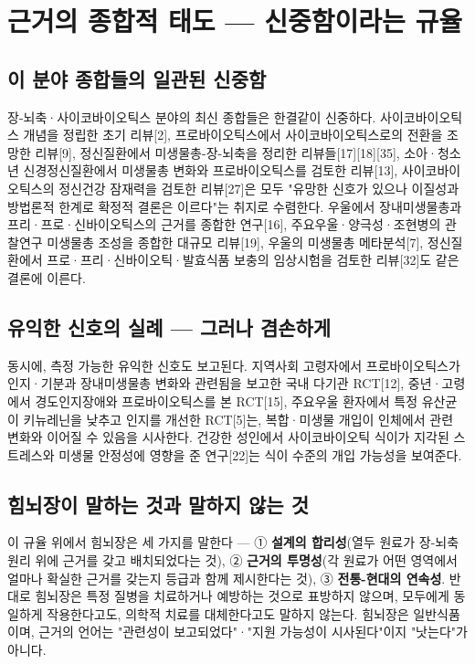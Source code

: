 \documentclass[11pt,oneside]{book}
\begin{document}
\section{근거의 종합적 태도 — 신중함이라는 규율}
\subsection{이 분야 종합들의 일관된 신중함}
장-뇌축·사이코바이오틱스 분야의 최신 종합들은 한결같이 신중하다. 사이코바이오틱스 개념을 정립한 초기 리뷰[2], 프로바이오틱스에서 사이코바이오틱스로의 전환을 조망한 리뷰[9], 정신질환에서 미생물총-장-뇌축을 정리한 리뷰들[17][18][35], 소아·청소년 신경정신질환에서 미생물총 변화와 프로바이오틱스를 검토한 리뷰[13], 사이코바이오틱스의 정신건강 잠재력을 검토한 리뷰[27]은 모두 "유망한 신호가 있으나 이질성과 방법론적 한계로 확정적 결론은 이르다"는 취지로 수렴한다. 우울에서 장내미생물총과 프리·프로·신바이오틱스의 근거를 종합한 연구[16], 주요우울·양극성·조현병의 관찰연구 미생물총 조성을 종합한 대규모 리뷰[19], 우울의 미생물총 메타분석[7], 정신질환에서 프로·프리·신바이오틱·발효식품 보충의 임상시험을 검토한 리뷰[32]도 같은 결론에 이른다.

\subsection{유익한 신호의 실례 — 그러나 겸손하게}
동시에, 측정 가능한 유익한 신호도 보고된다. 지역사회 고령자에서 프로바이오틱스가 인지·기분과 장내미생물총 변화와 관련됨을 보고한 국내 다기관 RCT[12], 중년·고령에서 경도인지장애와 프로바이오틱스를 본 RCT[15], 주요우울 환자에서 특정 유산균이 키뉴레닌을 낮추고 인지를 개선한 RCT[5]는, 복합·미생물 개입이 인체에서 관련 변화와 이어질 수 있음을 시사한다. 건강한 성인에서 사이코바이오틱 식이가 지각된 스트레스와 미생물 안정성에 영향을 준 연구[22]는 식이 수준의 개입 가능성을 보여준다.

\subsection{힘뇌장이 말하는 것과 말하지 않는 것}
이 규율 위에서 힘뇌장은 세 가지를 말한다 — ① \textbf{설계의 합리성}(열두 원료가 장-뇌축 원리 위에 근거를 갖고 배치되었다는 것), ② \textbf{근거의 투명성}(각 원료가 어떤 영역에서 얼마나 확실한 근거를 갖는지 등급과 함께 제시한다는 것), ③ \textbf{전통-현대의 연속성}. 반대로 힘뇌장은 특정 질병을 치료하거나 예방하는 것으로 표방하지 않으며, 모두에게 동일하게 작용한다고도, 의학적 치료를 대체한다고도 말하지 않는다. 힘뇌장은 일반식품이며, 근거의 언어는 "관련성이 보고되었다"·"지원 가능성이 시사된다"이지 "낫는다"가 아니다.
\end{document}
